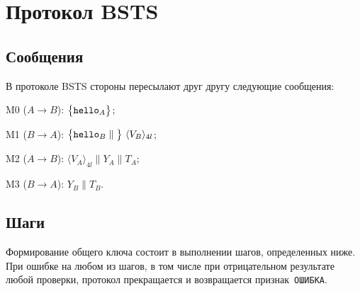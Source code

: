 \section{Протокол BSTS}\label{STS}

\subsection{Сообщения}\label{STS.Messages}

В протоколе BSTS
стороны пересылают друг другу следующие сообщения:

M0 ($A\to B$): 
$\mathbf{\bigl\{}\texttt{hello}_A\mathbf{\bigr\}}$;

M1 ($B\to A$): 
$\mathimplicit{\hello_B\parallel}\ 
\langle V_B\rangle_{4l}$;

M2 ($A\to B$): 
$\langle V_A\rangle_{4l}\parallel Y_A\parallel T_A$;

M3 ($B\to A$): 
$Y_B\parallel T_B$.

\subsection{Шаги}\label{STS.Steps}

Формирование общего ключа состоит в выполнении шагов, определенных ниже. При
ошибке на любом из шагов, в том числе при отрицательном результате любой
проверки, протокол прекращается и возвращается признак~\texttt{ОШИБКА}.

